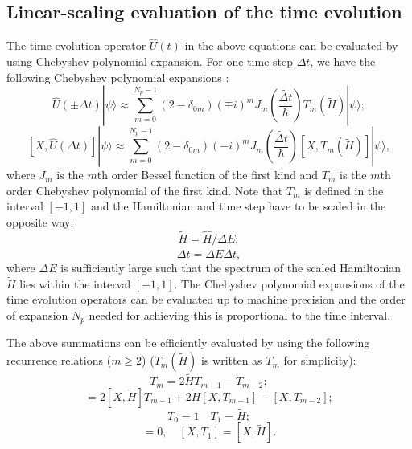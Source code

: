 \documentclass[12pt,a4paper]{report}
\begin{document}
\subsection{Linear-scaling evaluation of the time evolution}

The time evolution operator $\hat{U}(t)$ in the above equations can be evaluated by using Chebyshev polynomial expansion. For one time step $\Delta t$, we have the following Chebyshev polynomial expansions \cite{ezer1984jcp}:
\begin{equation}
\label{equation:cheb_1}
 \hat{U}(\pm \Delta t) |\psi\rangle
 \approx \sum_{m=0}^{N_p-1} (2-\delta_{0m}) (\mp i)^m
         J_m\left( \frac{\widetilde{\Delta t}}{\hbar} \right)
         T_m( \widetilde{H}) |\psi\rangle;
\end{equation}
\begin{equation}
\label{equation:cheb_2}
 [X, \hat{U}(\Delta t)] |\psi\rangle
 \approx \sum_{m=0}^{N_p-1} (2-\delta_{0m}) (-i)^m
J_m\left( \frac{\widetilde{\Delta t}}{\hbar} \right)
[X, T_m(\widetilde{H})] |\psi\rangle,
\end{equation}
where $J_m$ is the $m$th order Bessel function of the first kind and $T_m$ is the $m$th order Chebyshev polynomial of the first kind.
Note that $T_m$ is defined in the interval $[-1,1]$ and the Hamiltonian and time step have to be scaled in the opposite way:
\begin{equation}
\widetilde{H}=\hat{H}/\Delta E;
\end{equation}
\begin{equation}
\widetilde{\Delta t}= \Delta E \Delta t,
\end{equation}
where $\Delta E$ is sufficiently large such that the spectrum of the scaled Hamiltonian $\widetilde{H}$ lies within the interval $[-1,1]$. The Chebyshev polynomial expansions of the time evolution operators can be evaluated up to machine precision and the order of expansion $N_p$ needed for achieving this is proportional to the time interval. 

The above summations can be efficiently evaluated
by using the following  recurrence relations ($m \geq 2$)  ($T_m(\widetilde{H})$ is written as $T_m$ for simplicity):
\begin{equation}
 T_m = 2 \widetilde{H} T_{m-1} - T_{m-2};
\end{equation}
\begin{equation}
[X, T_m] = 2[X, \widetilde{H}] T_{m-1} + 2\widetilde{H} [X, T_{m-1}] - [X, T_{m-2}];
\end{equation}
\begin{equation}
 T_0 = 1 \quad
 T_1 = \widetilde{H};
\end{equation}
\begin{equation}
 [X, T_0] = 0, \quad
 [X, T_1] = [X,\widetilde{H}].
\end{equation}
\end{document}
